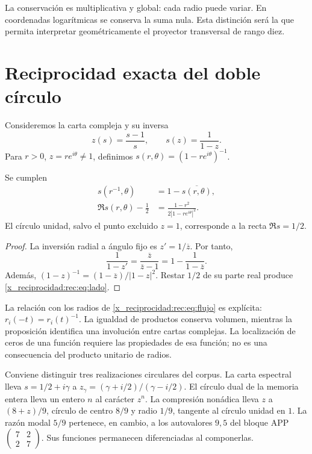 La conservación es multiplicativa y global: cada radio puede variar. En coordenadas logarítmicas se conserva la suma nula. Esta distinción será la que permita interpretar geométricamente el proyector transversal de rango diez.

\section{Reciprocidad exacta del doble círculo}
\label{x_reciprocidad:rec:doble-circulo}

Consideremos la carta compleja y su inversa
\[
 z(s)=\frac{s-1}{s},\qquad s(z)=\frac1{1-z}.
\]
Para \(r>0\), \(z=re^{i\theta}\ne1\), definimos \(s(r,\theta)=(1-re^{i\theta})^{-1}\).

\begin{proposition}
\label{x_reciprocidad:rec:prop:espejo}
Se cumplen
\begin{align}
 s(r^{-1},\theta)&=1-\overline{s(r,\theta)},\label{x_reciprocidad:rec:eq:espejo}\\
 \Re s(r,\theta)-\frac12&=
 \frac{1-r^2}{2|1-re^{i\theta}|^2}.\label{x_reciprocidad:rec:eq:lado}
\end{align}
El círculo unidad, salvo el punto excluido \(z=1\), corresponde a la recta \(\Re s=1/2\).
\end{proposition}
\begin{proof}
La inversión radial a ángulo fijo es \(z'=1/\overline z\). Por tanto,
\[
 \frac1{1-z'}=\frac{\overline z}{\overline z-1}
 =1-\frac1{1-\overline z}.
\]
Además, \((1-z)^{-1}=(1-\overline z)/|1-z|^2\). Restar \(1/2\) de su parte real produce \eqref{x_reciprocidad:rec:eq:lado}.
\end{proof}

La relación con los radios de \eqref{x_reciprocidad:rec:eq:flujo} es explícita: \(r_i(-t)=r_i(t)^{-1}\). La igualdad de productos conserva volumen, mientras la proposición identifica una involución entre cartas complejas. La localización de ceros de una función requiere las propiedades de esa función; no es una consecuencia del producto unitario de radios.

Conviene distinguir tres realizaciones circulares del corpus. La carta espectral lleva \(s=1/2+i\gamma\) a \(z_\gamma=(\gamma+i/2)/(\gamma-i/2)\). El círculo dual de la memoria entera lleva un entero \(n\) al carácter \(z^n\). La compresión nonádica lleva \(z\) a \((8+z)/9\), círculo de centro \(8/9\) y radio \(1/9\), tangente al círculo unidad en \(1\). La razón modal \(5/9\) pertenece, en cambio, a los autovalores \(9,5\) del bloque APP \(\left(\begin{smallmatrix}7&2\\2&7\end{smallmatrix}\right)\). Sus funciones permanecen diferenciadas al componerlas.

